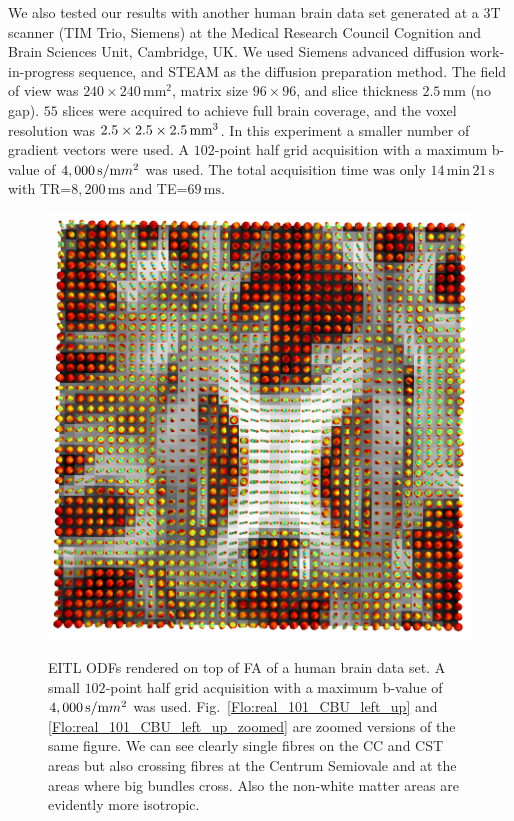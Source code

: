 \documentclass{bioinfo}
\begin{document}
We also tested our results with another human brain data set generated
at a 3T scanner (TIM Trio, Siemens) at the Medical Research Council
Cognition and Brain Sciences Unit, Cambridge, UK. We used Siemens
advanced diffusion work-in-progress sequence, and STEAM \citep{merboldt1992diffusion,MAB04}
as the diffusion preparation method. The field of view was $240\times240\,\textrm{mm}^{2}$,
matrix size $96\times96$, and slice thickness $2.5\,\textrm{mm}$
(no gap). $55$ slices were acquired to achieve full brain coverage,
and the voxel resolution was $2.5\times2.5\times2.5\,\textrm{mm\ensuremath{{}^{3}}}$.
In this experiment a smaller number of gradient vectors were used.
A $102$-point half grid acquisition with a maximum b-value of $4,000\,\textrm{s}/\textrm{m\ensuremath{m^{2}}}$
was used. The total acquisition time was only $14\,\textrm{min}\,21\,\textrm{s}$
with TR=$8,200\,\textrm{ms}$ and TE=$69\,\textrm{ms}$.

%
\begin{figure}
[th!]

\begin{centering}
\includegraphics[scale=0.3]{figures/real_101_eitl_005}
\par\end{centering}

\caption{EITL ODFs rendered on top of FA of a human brain data set. A small
$102$-point half grid acquisition with a maximum b-value of $4,000\,\textrm{s}/\textrm{m\ensuremath{m^{2}}}$
was used. Fig.~\ref{Flo:real_101_CBU_left_up} and \ref{Flo:real_101_CBU_left_up_zoomed}
are zoomed versions of the same figure. We can see clearly single
fibres on the CC and CST areas but also crossing fibres at the Centrum
Semiovale and at the areas where big bundles cross. Also the non-white
matter areas are evidently more isotropic.}


\centering{}\label{Flo:real_101_CBU}
\end{figure}
\end{document}
